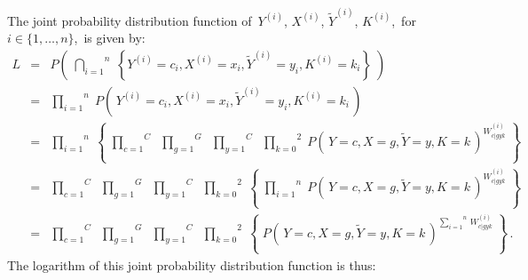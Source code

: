 \proof
The joint probability distribution function of
\,$Y^{(i)}$, $X^{(i)}$, $\widetilde{Y}^{(i)}$, $K^{(i)}$,
\,for \,$i \in \{1,\ldots,n\}$,
\,is given by:
\begin{eqnarray*}
L &=&
	P\!\left(\;
		\overset{n}{\underset{i=1}{\bigcap}}\;
		\left\{
			Y^{(i)}=c_{i},X^{(i)}=x_{i},\widetilde{Y}^{(i)}=y_{i},K^{(i)}=k_{i}
		\right\}
	\;\right)
\\
&=&
	\overset{n}{\underset{i=1}{\prod}} \;
	P\!\left(\,Y^{(i)}=c_{i},X^{(i)}=x_{i},\widetilde{Y}^{(i)}=y_{i},K^{(i)}=k_{i}\,\right)
\\
&=&
	\overset{n}{\underset{i=1}{\prod}} \;
	\left\{\;
		\overset{C}{\underset{c=1}{\prod}}\;\;
		\overset{G}{\underset{g=1}{\prod}}\;\;
		\overset{C}{\underset{y=1}{\prod}}\;\;
		\overset{2}{\underset{k=0}{\prod}}\;
		P\!\left(\,Y=c,X=g,\widetilde{Y}=y,K=k\,\right)^{W^{(i)}_{c \vert gyk}}
	\;\right\}
\\
&=&
	\overset{C}{\underset{c=1}{\prod}}\;\;
	\overset{G}{\underset{g=1}{\prod}}\;\;
	\overset{C}{\underset{y=1}{\prod}}\;\;
	\overset{2}{\underset{k=0}{\prod}}\;
	\left\{\;
		\overset{n}{\underset{i=1}{\prod}} \;
		P\!\left(\,Y=c,X=g,\widetilde{Y}=y,K=k\,\right)^{W^{(i)}_{c \vert gyk}}
	\;\right\}
\\
&=&
	\overset{C}{\underset{c=1}{\prod}}\;\;
	\overset{G}{\underset{g=1}{\prod}}\;\;
	\overset{C}{\underset{y=1}{\prod}}\;\;
	\overset{2}{\underset{k=0}{\prod}}\;
	\left\{\;
		P\!\left(\,Y=c,X=g,\widetilde{Y}=y,K=k\,\right)
		^{\overset{n}{\underset{i=1}{\sum}}\,W^{(i)}_{c \vert gyk}}
	\;\right\}\,.
\end{eqnarray*}
The logarithm of this joint probability distribution function is thus:
